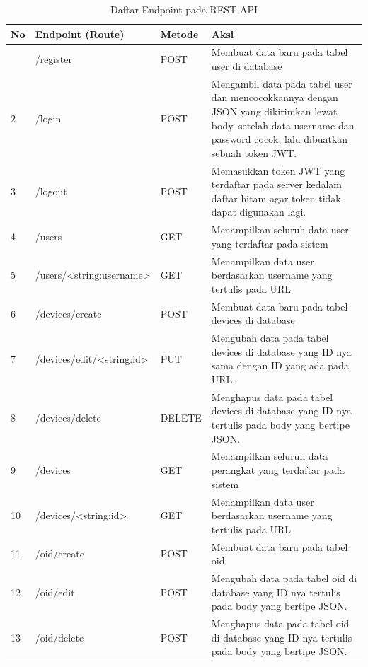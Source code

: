 \begin{longtable}{|p{}|p{}|p{}|p{}|}
        		\caption{Daftar Endpoint pada REST API} \label{tabelEndpointRESTAPI} \\
        		\hline
        		\textbf{No} & \textbf{Endpoint (Route)} & \textbf{Metode} & \textbf{Aksi} \\ \hline
        		\endhead
        		\endfoot
        		\endlastfoot
        		1 & /register & POST & Membuat data baru pada tabel user di database \\ \hline
        		2 & /login & POST & Mengambil data pada tabel user dan mencocokkannya dengan JSON yang dikirimkan lewat body. setelah data username dan password cocok, lalu dibuatkan sebuah token JWT. \\ \hline
        		3 & /logout & POST & Memasukkan token JWT yang terdaftar pada server kedalam daftar hitam agar token tidak dapat digunakan lagi. \\ \hline
        		4 & /users & GET & Menampilkan seluruh data user yang terdaftar pada sistem \\ \hline
        		5 & /users/\textless{}string:username\textgreater{} & GET & Menampilkan data user berdasarkan username yang tertulis pada URL \\ \hline
        		6 & /devices/create & POST & Membuat data baru pada tabel devices di database \\ \hline
        		7 & /devices/edit/\textless{}string:id\textgreater{} & PUT & Mengubah data pada tabel devices di database yang ID nya sama dengan ID yang ada pada URL. \\ \hline
        		8 & /devices/delete & DELETE & Menghapus data pada tabel devices di database yang ID nya tertulis pada body yang bertipe JSON. \\ \hline
        		9 & /devices & GET & Menampilkan seluruh data perangkat yang terdaftar pada sistem \\ \hline
        		10 & /devices/\textless{}string:id\textgreater{} & GET & Menampilkan data user berdasarkan username yang tertulis pada URL \\ \hline
        		11 & /oid/create & POST & Membuat data baru pada tabel oid \\ \hline
        		12 & /oid/edit & POST & Mengubah data pada tabel oid di database yang ID nya tertulis pada body yang bertipe JSON. \\ \hline
        		13 & /oid/delete & POST & Menghapus data pada tabel oid di database yang ID nya tertulis pada body yang bertipe JSON. \\ \hline

\end{longtable}
